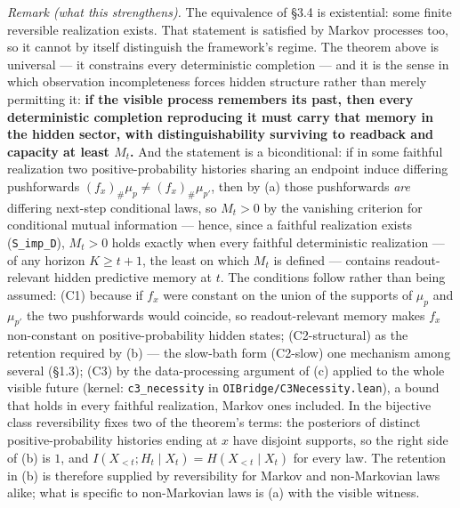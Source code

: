 \documentclass[
]{article}
\begin{document}
\emph{Remark (what this strengthens).} The equivalence of §3.4 is
existential: some finite reversible realization exists. That statement
is satisfied by Markov processes too, so it cannot by itself distinguish
the framework's regime. The theorem above is universal --- it constrains
every deterministic completion --- and it is the sense in which
observation incompleteness forces hidden structure rather than merely
permitting it: \textbf{if the visible process remembers its past, then
every deterministic completion reproducing it must carry that memory in
the hidden sector, with distinguishability surviving to readback and
capacity at least \(M_t\).} And the statement is a biconditional: if in
some faithful realization two positive-probability histories sharing an
endpoint induce differing pushforwards
\((f_x)_\# \mu_p \neq (f_x)_\# \mu_{p'}\), then by (a) those
pushforwards \emph{are} differing next-step conditional laws, so
\(M_t > 0\) by the vanishing criterion for conditional mutual
information --- hence, since a faithful realization exists
(\texttt{S\_imp\_D}), \(M_t > 0\) holds exactly when every faithful
deterministic realization --- of any horizon \(K \geq t+1\), the least
on which \(M_t\) is defined --- contains readout-relevant hidden
predictive memory at \(t\). The conditions follow rather than being
assumed: (C1) because if \(f_x\) were constant on the union of the
supports of \(\mu_p\) and \(\mu_{p'}\) the two pushforwards would
coincide, so readout-relevant memory makes \(f_x\) non-constant on
positive-probability hidden states; (C2-structural) as the retention
required by (b) --- the slow-bath form (C2-slow) one mechanism among
several (§1.3); (C3) by the data-processing argument of (c) applied to
the whole visible future (kernel: \texttt{c3\_necessity} in
\texttt{OIBridge/C3Necessity.lean}), a bound that holds in every
faithful realization, Markov ones included. In the bijective class
reversibility fixes two of the theorem's terms: the posteriors of
distinct positive-probability histories ending at \(x\) have disjoint
supports, so the right side of (b) is \(1\), and
\(I(X_{<t}; H_t \mid X_t) = H(X_{<t} \mid X_t)\) for every law. The
retention in (b) is therefore supplied by reversibility for Markov and
non-Markovian laws alike; what is specific to non-Markovian laws is (a)
with the visible witness.
\end{document}
